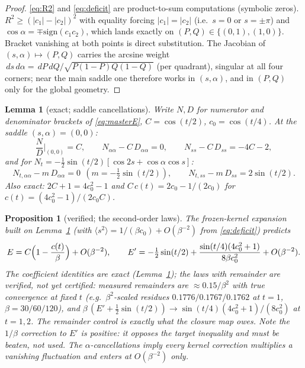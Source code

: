 \documentclass[11pt]{article}
\newtheorem{lemma}[theorem]{Lemma}
\newtheorem{proposition}[theorem]{Proposition}
\theoremstyle{remark}
\newcommand{\dd}{\,d}
\begin{document}
\begin{proof}
\eqref{eq:R2} and \eqref{eq:deficit} are product-to-sum computations
(symbolic zeros). $R^2\ge(|c_1|-|c_2|)^2$ with equality forcing
$|c_1|=|c_2|$ (i.e.\ $s=0$ or $s=\pm\pi$) and $\cos\alpha=\mp
\mathrm{sign}(c_1c_2)$, which lands exactly on $(P,Q)\in\{(0,1),(1,0)\}$.
Bracket vanishing at both points is direct substitution. The Jacobian of
$(s,\alpha)\mapsto(P,Q)$ carries the arcsine weight
$\dd s\dd\alpha=\dd P\dd Q/\sqrt{P(1-P)Q(1-Q)}$ (per quadrant), singular
at all four corners; near the main saddle one therefore works in
$(s,\alpha)$, and in $(P,Q)$ only for the global geometry.
\end{proof}

\begin{lemma}[exact; saddle cancellations]
\label{lem:cancel}
Write $N,D$ for numerator and denominator brackets of \eqref{eq:masterE},
$C=\cos(t/2)$, $c_0=\cos(t/4)$. At the saddle $(s,\alpha)=(0,0)$:
\[
\frac{N}{D}\Big|_{(0,0)}=C,\qquad
N_{\alpha\alpha}-C\,D_{\alpha\alpha}=0,\qquad
N_{ss}-C\,D_{ss}=-4C-2,
\]
and for $N_t=-\tfrac12\sin(t/2)[\cos2s+\cos\alpha\cos s]$:
\[
N_{t,\alpha\alpha}-m\,D_{\alpha\alpha}=0\ \ (m=-\tfrac12\sin(t/2)),
\qquad N_{t,ss}-m\,D_{ss}=2\sin(t/2).
\]
Also exact: $2C+1=4c_0^2-1$ and $C\,c(t)=2c_0-1/(2c_0)$ for
$c(t)=(4c_0^2-1)/(2c_0C)$.
\end{lemma}

\begin{proposition}[verified; the second-order laws]\label{prop:secondorder}
The frozen-kernel expansion built on Lemma~\ref{lem:cancel} (with
$\langle s^2\rangle=1/(\beta c_0)+O(\beta^{-2})$ from
\eqref{eq:deficit}) predicts
\begin{equation}\label{eq:secondorder}
E=C\Bigl(1-\frac{c(t)}{\beta}\Bigr)+O(\beta^{-2}),\qquad
E'=-\tfrac12\sin(t/2)+\frac{\sin(t/4)(4c_0^2+1)}{8\beta c_0^2}
+O(\beta^{-2}).
\end{equation}
The coefficient identities are exact (Lemma~\ref{lem:cancel}); the
\emph{laws with remainder} are verified, not yet certified: measured
remainders are $\approx0.15/\beta^2$ with true convergence at fixed $t$
(e.g.\ $\beta^2$-scaled residues $0.1776/0.1767/0.1762$ at $t=1$,
$\beta=30/60/120$), and $\beta\,(E'+\tfrac12\sin(t/2))\to
\sin(t/4)(4c_0^2+1)/(8c_0^2)$ at $t=1,2$. The remainder control is
exactly what the closure map owes. Note the $1/\beta$ correction to $E'$
is \emph{positive}: it opposes the target inequality and must be beaten,
not used. The $\alpha$-cancellations imply every kernel correction
multiplies a vanishing fluctuation and enters at $O(\beta^{-2})$ only.
\end{proposition}
\end{document}
